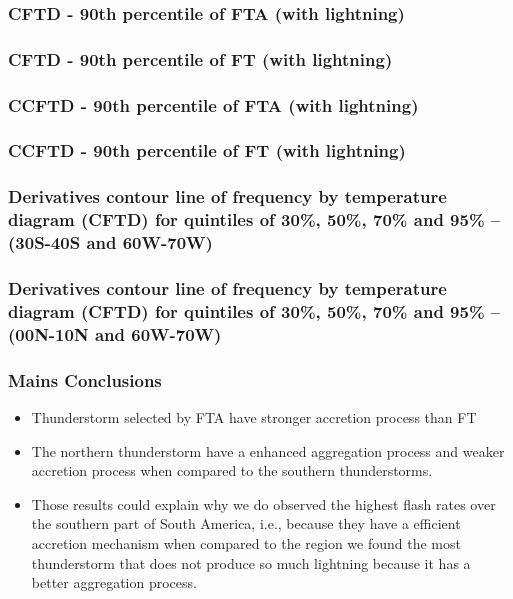 \documentclass[smaller]{beamer}
\begin{document}



\begin{frame}
\frametitle{CFTD - 90th percentile of FTA (with lightning) }

\end{frame}
\begin{frame}
\frametitle{CFTD - 90th percentile of FT (with lightning) }

\end{frame}


\begin{frame}
\frametitle{CCFTD - 90th percentile of FTA (with lightning)}

\end{frame}
\begin{frame}
\frametitle{CCFTD - 90th percentile of FT (with lightning)}

\end{frame}

\begin{frame}
\frametitle{Derivatives contour line of frequency by temperature diagram (CFTD)  for quintiles of 30\%, 50\%, 70\% and 95\% -- (30S-40S and 60W-70W)}

\end{frame}

\begin{frame}
\frametitle{Derivatives contour line of frequency by temperature diagram (CFTD)  for quintiles of 30\%, 50\%, 70\% and 95\% -- (00N-10N and 60W-70W)}

\end{frame}




\begin{frame}
\frametitle{Mains Conclusions}
\begin{itemize}
\item Thunderstorm selected by FTA have stronger accretion process than FT
\item The northern thunderstorm have a enhanced aggregation process and weaker accretion process when compared to the southern thunderstorms.
\item Those results could explain why we do observed the highest flash rates over the southern part of South America, i.e., because they have a efficient accretion mechanism when compared to the region we found the most thunderstorm that does not produce so much lightning because it has a better aggregation process.
\end{itemize}

\end{frame}
\end{document}
